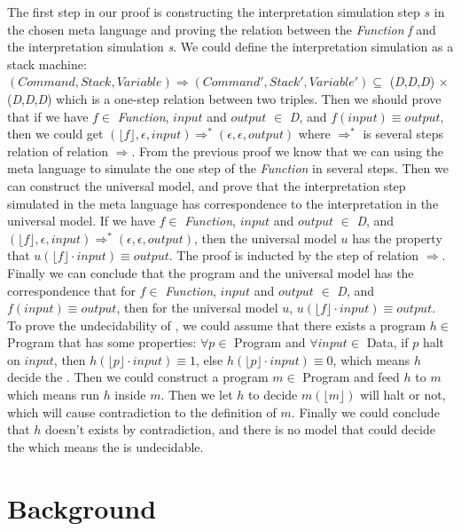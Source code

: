 The first step in our proof is constructing the interpretation simulation step $s$ in the chosen meta language and proving the relation between the \textit{Function} \textit{f} and the interpretation simulation \textit{s}.
We could define the interpretation simulation as a stack machine: $(Command,Stack,Variable) \Rightarrow (Command',Stack',Variable') \subseteq$ (\textit{D},\textit{D},\textit{D}) $\times$ (\textit{D},\textit{D},\textit{D}) which is a one-step relation between two triples.
Then we should prove that if we have $f \in$ \textit{Function}, $input$ and $output$ $\in$ \textit{D}, and $f(input) \equiv output$, then we could get $(\lfloor f\rfloor,\epsilon,input) \Rightarrow^{*} (\epsilon,\epsilon,output)$ where $\Rightarrow^{*}$ is several steps relation of relation $\Rightarrow$.
From the previous proof we know that we can using the meta language to simulate the one step of the \textit{Function} in several steps.
Then we can construct the universal model, and prove that the interpretation step simulated in the meta language has correspondence to the interpretation in the universal model.
If we have $f \in$ \textit{Function}, $input$ and $output$ $\in$ \textit{D}, and $(\lfloor f\rfloor,\epsilon,input) \Rightarrow^{*} (\epsilon,\epsilon,output)$, then the universal model $u$ has the property that $u(\lfloor f\rfloor \cdot input) \equiv output$.
The proof is inducted by the step of relation $\Rightarrow$.
Finally we can conclude that the program and the universal model has the correspondence that for $f \in$ \textit{Function}, $input$ and $output$ $\in$ \textit{D}, and $f(input) \equiv output$, then for the universal model $u$,  $u(\lfloor f\rfloor \cdot input) \equiv output$.\\
To prove the undecidability of , we could assume that there exists a program $h \in$ Program that has some properties: $\forall p \in$ Program and $\forall input \in$ Data, if $p$ halt on $input$, then $h(\lfloor p\rfloor \cdot input) \equiv 1$, else $h(\lfloor p\rfloor \cdot input) \equiv 0$, which means $h$ decide the .
Then we could construct a program $m \in$ Program and feed $h$ to $m$ which means run $h$ inside $m$.
Then we let $h$ to decide $m(\lfloor m\rfloor)$ will halt or not, which will cause contradiction to the definition of $m$.
Finally we could conclude that $h$ doesn't exists by contradiction, and there is no model that could decide the  which means the  is undecidable.

\section{Background}
